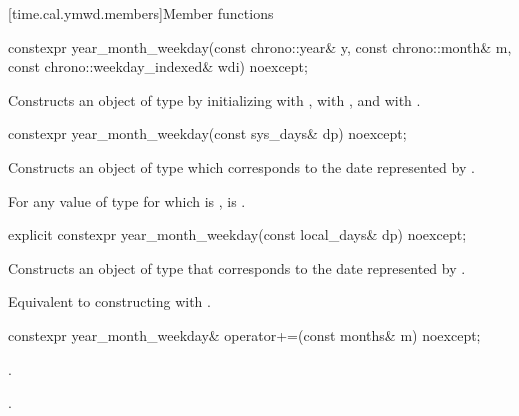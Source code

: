 [time.cal.ymwd.members]{Member functions}

%
\begin{itemdecl}
constexpr year_month_weekday(const chrono::year& y, const chrono::month& m,
                             const chrono::weekday_indexed& wdi) noexcept;
\end{itemdecl}

\begin{itemdescr}
\pnum
\effects
Constructs an object of type  by
initializing  with ,  with , and  with .
\end{itemdescr}

%
\begin{itemdecl}
constexpr year_month_weekday(const sys_days& dp) noexcept;
\end{itemdecl}

\begin{itemdescr}
\pnum
\effects
Constructs an object of type 
which corresponds to the date represented by .

\pnum
\remarks
For any value  of type 
for which  is ,
 is .
\end{itemdescr}

%
\begin{itemdecl}
explicit constexpr year_month_weekday(const local_days& dp) noexcept;
\end{itemdecl}

\begin{itemdescr}
\pnum
\effects
Constructs an object of type 
that corresponds to the date represented by .

\pnum
\remarks
Equivalent to constructing with .
\end{itemdescr}

%
\begin{itemdecl}
constexpr year_month_weekday& operator+=(const months& m) noexcept;
\end{itemdecl}

\begin{itemdescr}
\pnum
\effects {}.

\pnum
\returns {}.
\end{itemdescr}

